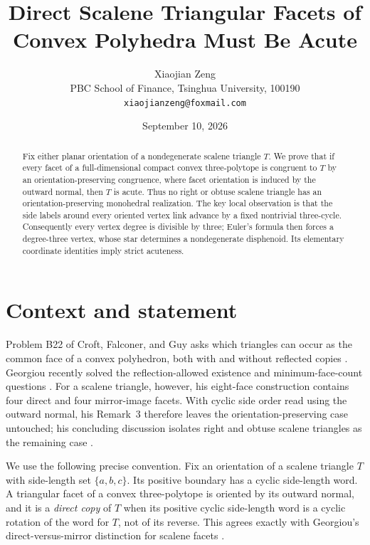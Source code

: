 \documentclass[11pt]{article}
\title{Direct Scalene Triangular Facets of Convex Polyhedra Must Be Acute}
\author{Xiaojian Zeng\\
  \small PBC School of Finance, Tsinghua University, 100190\\
  \small \texttt{xiaojianzeng@foxmail.com}}
\date{September 10, 2026}
\begin{document}
\maketitle

\begin{abstract}
Fix either planar orientation of a nondegenerate scalene triangle $T$.
We prove that if every facet of a full-dimensional compact convex
three-polytope is congruent to $T$ by an orientation-preserving congruence,
where facet orientation is induced by the outward normal, then $T$ is acute.
Thus no right or obtuse scalene triangle has an orientation-preserving
monohedral realization.  The key local observation is that the side labels
around every oriented vertex link advance by a fixed nontrivial three-cycle.
Consequently every vertex degree is divisible by three; Euler's formula then
forces a degree-three vertex, whose star determines a nondegenerate
disphenoid.  Its elementary coordinate identities imply strict acuteness.
\end{abstract}

\section{Context and statement}

Problem B22 of Croft, Falconer, and Guy asks which triangles can occur as the
common face of a convex polyhedron, both with and without reflected copies
\cite[Problem B22]{CroftFalconerGuy1991}.  Georgiou recently solved the
reflection-allowed existence and minimum-face-count questions
\cite{Georgiou2026}.  For a scalene triangle, however, his eight-face
construction contains four direct and four mirror-image facets.  With cyclic
side order read using the outward normal, his Remark~3 therefore leaves the
orientation-preserving case untouched; his concluding discussion isolates
right and obtuse scalene triangles as the remaining case
\cite[Remark~3 and Section~4]{Georgiou2026}.

We use the following precise convention.  Fix an orientation of a scalene
triangle $T$ with side-length set $\{a,b,c\}$.  Its positive boundary has a
cyclic side-length word.  A triangular facet of a convex three-polytope is
oriented by its outward normal, and it is a \emph{direct copy} of $T$ when its
positive cyclic side-length word is a cyclic rotation of the word for $T$,
not of its reverse.  This agrees exactly with Georgiou's direct-versus-mirror
distinction for scalene facets \cite[Remark~3]{Georgiou2026}.
\end{document}
